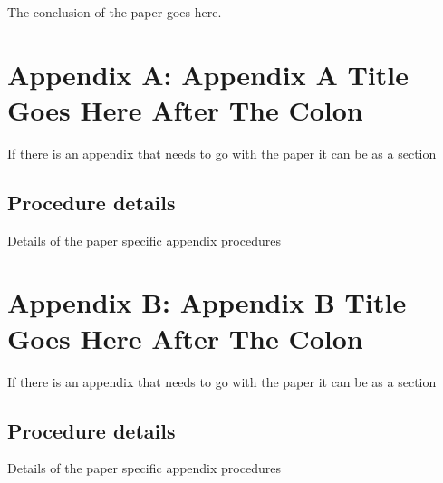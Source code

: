 The conclusion of the paper goes here.
\autocite{buiEveryGeneratingPolytope2023}

\printbibliography[heading=subbibnumbered]

\section{Appendix A: Appendix A Title Goes Here After The Colon}
If there is an appendix that needs to go with the paper it can be as a section \autocite{kleeHellyTheoremIts1963}

\subsection{Procedure details}
Details of the paper specific appendix procedures


\section{Appendix B: Appendix B Title Goes Here After The Colon}
If there is an appendix that needs to go with the paper it can be as a section \autocite{chenGraphHomotopyGraham2001}

\subsection{Procedure details}
Details of the paper specific appendix procedures